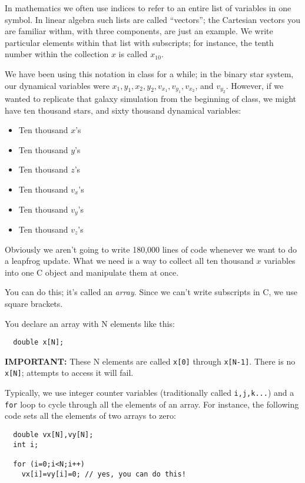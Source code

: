 \documentclass[12ampt]{article}
\begin{document}
\Large
\centerline{} 
\normalsize

In mathematics we often use indices to refer to an entire list of variables
in one symbol. In linear algebra such lists are called ``vectors''; the 
Cartesian vectors you are familiar withm, with three components, are just
an example. We write particular elements within that list with subscripts; 
for instance, the tenth number within the collection $x$ is called $x_{10}$.

We have been using this notation in class for a while; in the binary star system,
our dynamical variables were $x_1, y_1, x_2, y_2, v_{x_1}, v_{y_1}, v_{x_2}$, and $v_{y_2}$. However,
if we wanted to replicate that galaxy simulation from the beginning of class, we might have ten thousand
stars, and sixty thousand dynamical variables:

\begin{itemize}
  \item{Ten thousand $x$'s}
  \item{Ten thousand $y$'s}
  \item{Ten thousand $z$'s}
  \item{Ten thousand $v_x$'s}
  \item{Ten thousand $v_y$'s}
  \item{Ten thousand $v_z$'s}
\end{itemize}

Obviously we aren't going to write 180,000 lines of code whenever we want to do a leapfrog update. What we need is a way to collect all ten thousand $x$ 
variables into one C object and manipulate them at once.

You can do this; it's called an {\it array}. Since we can't write subscripts in C, we use square brackets.

You declare an array with N elements like this:

\begin{verbatim}
  double x[N];
\end{verbatim}

{\bf IMPORTANT:} These N elements are called \verb|x[0]| through \verb|x[N-1]|. There is no \verb|x[N]|; attempts to access it will fail.

Typically, we use integer counter variables (traditionally called {\texttt{i,j,k...}}) 
and a {\texttt{for}} loop to cycle through all the elements of an array. For instance, the following code
sets all the elements of two arrays to zero:

\begin{verbatim} 
  double vx[N],vy[N];
  int i;

  for (i=0;i<N;i++)
    vx[i]=vy[i]=0; // yes, you can do this!
\end{verbatim}
\end{document}
